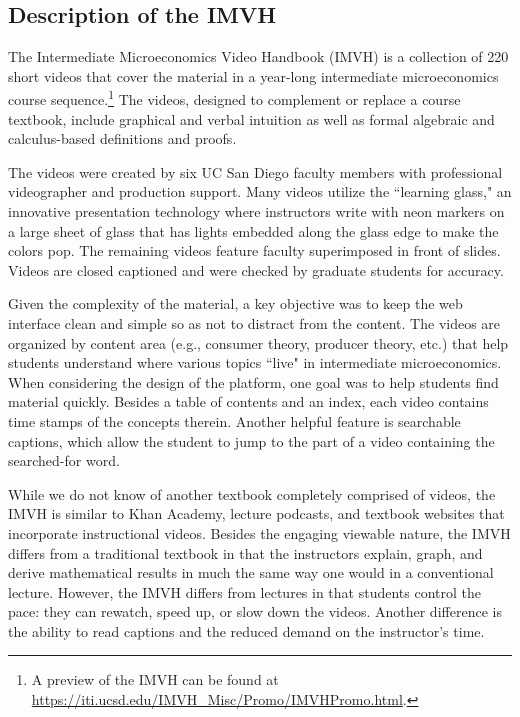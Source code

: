 \documentclass[12pt]{article}
\begin{document}
\subsection{Description of the IMVH}

The Intermediate Microeconomics Video Handbook (IMVH) is a collection of 220 short videos that cover the material in a year-long intermediate microeconomics course sequence.\footnote{A preview of the IMVH can be found at \url{https://iti.ucsd.edu/IMVH_Misc/Promo/IMVHPromo.html}.} The videos, designed to complement or replace a course textbook, include graphical and verbal intuition as well as formal algebraic and calculus-based definitions and proofs.

The videos were created by six UC San Diego faculty members with professional videographer and production support. Many videos utilize the ``learning glass," an innovative presentation technology where instructors write with neon markers on a large sheet of glass that has lights embedded along the glass edge to make the colors pop. The remaining videos feature faculty superimposed in front of slides. Videos are closed captioned and were checked by graduate students for accuracy.

Given the complexity of the material, a key objective was to keep the web interface clean and simple so as not to distract from the content. The videos are organized by content area (e.g., consumer theory, producer theory, etc.) that help students understand where various topics ``live" in intermediate microeconomics. When considering the design of the platform, one goal was to help students find material quickly. Besides a table of contents and an index, each video contains time stamps of the concepts therein. Another helpful feature is searchable captions, which allow the student to jump to the part of a video containing the searched-for word.

While we do not know of another textbook completely comprised of videos, the IMVH is similar to Khan Academy, lecture podcasts, and textbook websites that incorporate instructional videos. Besides the engaging viewable nature, the IMVH differs from a traditional textbook in that the instructors explain, graph, and derive mathematical results in much the same way one would in a conventional lecture. However, the IMVH differs from lectures in that students control the pace: they can rewatch, speed up, or slow down the videos. Another difference is the ability to read captions and the reduced demand on the instructor's time.
\end{document}
